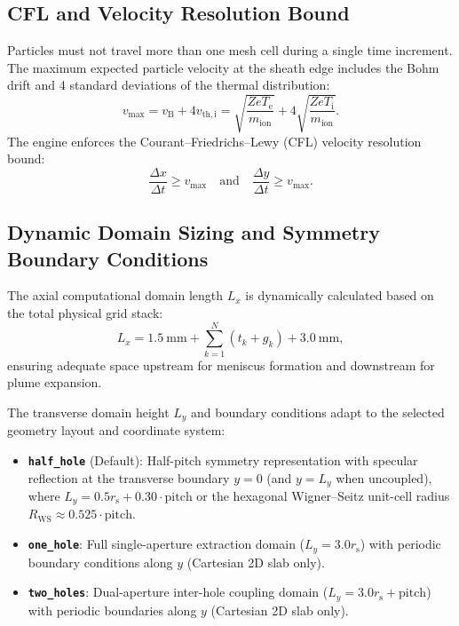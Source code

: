 \documentclass[11pt,a4paper]{article}
\begin{document}
\subsection{CFL and Velocity Resolution Bound}
Particles must not travel more than one mesh cell during a single time increment. The maximum expected particle velocity at the sheath edge includes the Bohm drift and 4 standard deviations of the thermal distribution:
\begin{equation}
    v_{\max} = v_{\mathrm{B}} + 4 v_{\mathrm{th,i}} = \sqrt{\frac{Z e T_{\mathrm{e}}}{m_{\mathrm{ion}}}} + 4\sqrt{\frac{Z e T_{\mathrm{i}}}{m_{\mathrm{ion}}}}.
\end{equation}
The engine enforces the Courant--Friedrichs--Lewy (CFL) velocity resolution bound:
\begin{equation}
    \frac{\Delta x}{\Delta t} \ge v_{\max} \quad \text{and} \quad \frac{\Delta y}{\Delta t} \ge v_{\max}.
\end{equation}

\subsection{Dynamic Domain Sizing and Symmetry Boundary Conditions}
The axial computational domain length $L_x$ is dynamically calculated based on the total physical grid stack:
\begin{equation}
    L_x = \SI{1.5}{\milli\meter} + \sum_{k=1}^{N} \left(t_k + g_k\right) + \SI{3.0}{\milli\meter},
\end{equation}
ensuring adequate space upstream for meniscus formation and downstream for plume expansion.

The transverse domain height $L_y$ and boundary conditions adapt to the selected geometry layout and coordinate system:
\begin{itemize}[nosep]
    \item \textbf{\texttt{half\_hole}} (Default): Half-pitch symmetry representation with specular reflection at the transverse boundary $y = 0$ (and $y = L_y$ when uncoupled), where $L_y = 0.5 r_{\mathrm{s}} + 0.30 \cdot \text{pitch}$ or the hexagonal Wigner--Seitz unit-cell radius $R_{\mathrm{WS}} \approx 0.525 \cdot \text{pitch}$.
    \item \textbf{\texttt{one\_hole}}: Full single-aperture extraction domain ($L_y = 3.0 r_{\mathrm{s}}$) with periodic boundary conditions along $y$ (Cartesian 2D slab only).
    \item \textbf{\texttt{two\_holes}}: Dual-aperture inter-hole coupling domain ($L_y = 3.0 r_{\mathrm{s}} + \text{pitch}$) with periodic boundaries along $y$ (Cartesian 2D slab only).
\end{itemize}
\end{document}

